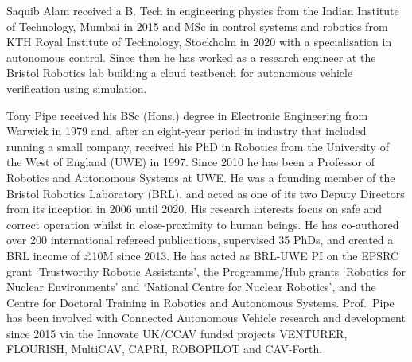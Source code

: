 \documentclass[letterpaper, 10 pt, journal, twoside]{IEEEtran}
\begin{document}
\begin{IEEEbiography}{Saquib Alam}
received a B. Tech  in engineering physics from the Indian Institute of Technology, Mumbai in 2015 and MSc in control systems and robotics from KTH Royal Institute of Technology, Stockholm in 2020 with a specialisation in autonomous control. Since then he has worked as a research engineer at the Bristol Robotics lab building a cloud testbench for autonomous vehicle verification using simulation. 
 \end{IEEEbiography}

\begin{IEEEbiography}{Tony Pipe} 
received his BSc (Hons.) degree in Electronic Engineering from Warwick in 1979 and, after an eight-year period in industry that included running a small company, received his PhD in Robotics from the University of the West of England (UWE) in 1997. Since 2010 he has been a Professor of Robotics and Autonomous Systems at UWE. He was a founding member of the Bristol Robotics Laboratory (BRL), and acted as one of its two Deputy Directors from its inception in 2006 until 2020. His research interests focus on safe and correct operation whilst in close-proximity to human beings. He has co-authored over 200 international refereed publications, supervised 35 PhDs, and created a BRL income of \pounds10M since 2013. He has acted as BRL-UWE PI on the EPSRC grant ‘Trustworthy Robotic Assistants’, the Programme/Hub grants ‘Robotics for Nuclear Environments’ and ‘National Centre for Nuclear Robotics’, and the Centre for Doctoral Training in Robotics and Autonomous Systems. Prof.\ Pipe has been involved with Connected Autonomous Vehicle research and development since 2015 via the Innovate UK/CCAV funded projects VENTURER, FLOURISH, MultiCAV, CAPRI, ROBOPILOT and CAV-Forth.
\end{IEEEbiography}
\end{document}
